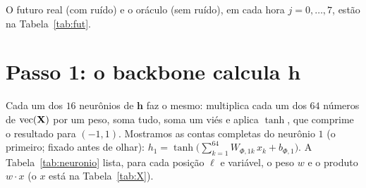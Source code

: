 \documentclass[11pt,a4paper]{article}
\newcommand{\bh}{\mathbf{h}}\newcommand{\bW}{\mathbf{W}}\newcommand{\bb}{\mathbf{b}}\newcommand{\bc}{\mathbf{c}}
\begin{document}
O futuro real (com ruído) e o oráculo (sem ruído), em cada hora $j=0,\dots,7$, estão na Tabela~\ref{tab:fut}.

\begin{table}[H]
\centering
\caption{Futuro real e oráculo.}\label{tab:fut}
\footnotesize
{}
\par\vspace{2pt}{\footnotesize Fonte: elaborado pelo autor.}
\end{table}

\section{Passo 1: o backbone calcula $\bh$}\label{sec:h}

Cada um dos $16$ neurônios de $\bh$ faz o mesmo: multiplica cada um dos $64$ números de $\mathrm{vec}(\mathbf{X})$ por um peso, soma tudo, soma um viés e aplica $\tanh$, que comprime o resultado para $(-1,1)$. Mostramos as contas completas do neurônio $1$ (o primeiro; fixado antes de olhar): $h_1=\tanh\big(\sum_{k=1}^{64}W_{\Phi,1k}\,x_k+b_{\Phi,1}\big)$. A Tabela~\ref{tab:neuronio} lista, para cada posição $\ell$ e variável, o peso $w$ e o produto $w\cdot x$ (o $x$ está na Tabela~\ref{tab:X}).
\end{document}
